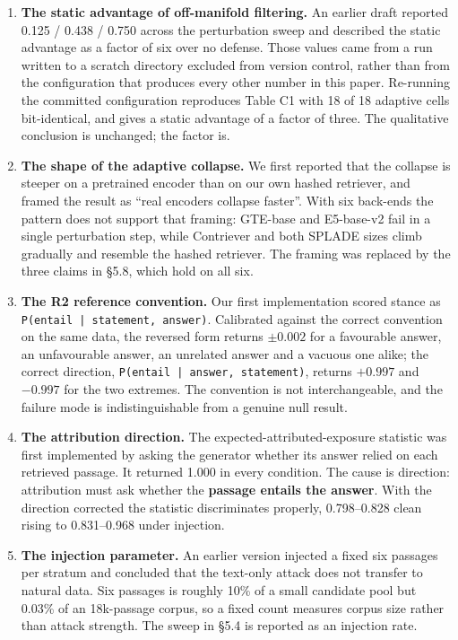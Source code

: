 \documentclass[authoryear,review,3p,times]{elsarticle}
\providecommand{\tightlist}{%
  \setlength{\itemsep}{0pt}\setlength{\parskip}{0pt}}
\begin{document}
\begin{enumerate}
\def\labelenumi{\arabic{enumi}.}
\tightlist
\item
  \textbf{The static advantage of off-manifold filtering.} An earlier draft reported 0.125 / 0.438 / 0.750 across the perturbation sweep and described the static advantage as a factor of six over no defense. Those values came from a run written to a scratch directory excluded from version control, rather than from the configuration that produces every other number in this paper. Re-running the committed configuration reproduces Table C1 with 18 of 18 adaptive cells bit-identical, and gives a static advantage of a factor of three. The qualitative conclusion is unchanged; the factor is.
\item
  \textbf{The shape of the adaptive collapse.} We first reported that the collapse is steeper on a pretrained encoder than on our own hashed retriever, and framed the result as ``real encoders collapse faster''. With six back-ends the pattern does not support that framing: GTE-base and E5-base-v2 fail in a single perturbation step, while Contriever and both SPLADE sizes climb gradually and resemble the hashed retriever. The framing was replaced by the three claims in §5.8, which hold on all six.
\item
  \textbf{The R2 reference convention.} Our first implementation scored stance as \texttt{P(entail | statement, answer)}. Calibrated against the correct convention on the same data, the reversed form returns \(\pm 0.002\) for a favourable answer, an unfavourable answer, an unrelated answer and a vacuous one alike; the correct direction, \texttt{P(entail | answer, statement)}, returns \(+0.997\) and \(-0.997\) for the two extremes. The convention is not interchangeable, and the failure mode is indistinguishable from a genuine null result.
\item
  \textbf{The attribution direction.} The expected-attributed-exposure statistic was first implemented by asking the generator whether its answer relied on each retrieved passage. It returned 1.000 in every condition. The cause is direction: attribution must ask whether the \textbf{passage entails the answer}. With the direction corrected the statistic discriminates properly, 0.798--0.828 clean rising to 0.831--0.968 under injection.
\item
  \textbf{The injection parameter.} An earlier version injected a fixed six passages per stratum and concluded that the text-only attack does not transfer to natural data. Six passages is roughly 10\% of a small candidate pool but 0.03\% of an 18k-passage corpus, so a fixed count measures corpus size rather than attack strength. The sweep in §5.4 is reported as an injection rate.

\end{enumerate}
\end{document}
